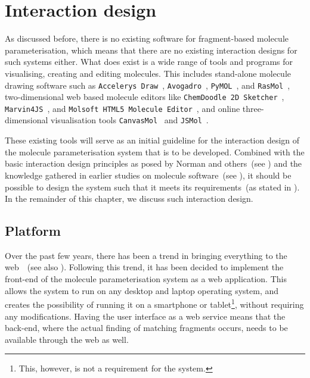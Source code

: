 \chapter{Interaction design}

As discussed before, there is no existing software for fragment-based molecule parameterisation, which means that there are no existing interaction designs for such systems either. What does exist is a wide range of tools and programs for visualising, creating and editing molecules. This includes stand-alone molecule drawing software such as \verb|Accelerys Draw|~\cite{accelrys2012accelrys}, \verb|Avogadro|~\cite{hanwell2012avogadro}, \verb|PyMOL|~\cite{delano2002pymol}, and \verb|RasMol|~\cite{pembroke2000bio}, two-dimensional web based molecule editors like \verb|ChemDoodle 2D Sketcher|~\cite{ichemlabs2013chemdoodle}, \verb|Marvin4JS|~\cite{chemxon2013marvin}, and \verb|Molsoft HTML5 Molecule Editor|~\cite{molsoft2012molsoft}, and online three-dimensional visualisation tools \verb|CanvasMol|~\cite{altered2013canvasmol} and \verb|JSMol|~\cite{hanson2013jsmol}.

These existing tools will serve as an initial guideline for the interaction design of the molecule parameterisation system that is to be developed. Combined with the basic interaction design principles as posed by Norman and others~(see ) and the knowledge gathered in earlier studies on molecule software~(see ), it should be possible to design the system such that it meets its requirements~(as stated in ). In the remainder of this chapter, we discuss such interaction design.



\section{Platform}
Over the past few years, there has been a trend in bringing everything to the web~\cite{ertl2010molecular}~(see also ). Following this trend, it has been decided to implement the front-end of the molecule parameterisation system as a web application. This allows the system to run on any desktop and laptop operating system, and creates the possibility of running it on a smartphone or tablet\footnote{This, however, is not a requirement for the system.}, without requiring any modifications. Having the user interface as a web service means that the back-end, where the actual finding of matching fragments occurs, needs to be available through the web as well.



